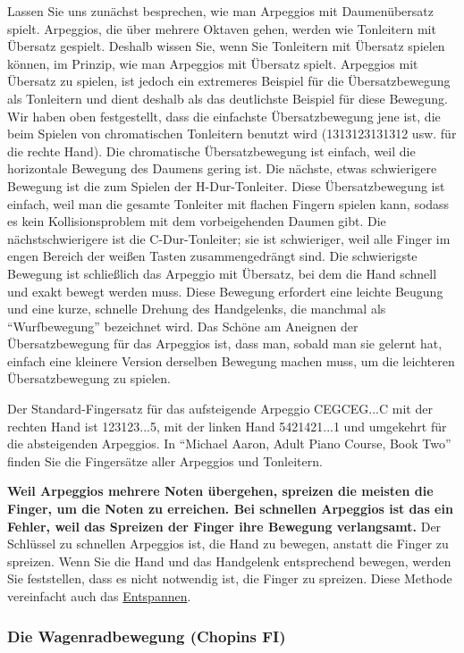 Lassen Sie uns zunächst besprechen, wie man Arpeggios mit Daumenübersatz spielt.
Arpeggios, die über mehrere Oktaven gehen, werden wie Tonleitern mit Übersatz gespielt.
Deshalb wissen Sie, wenn Sie Tonleitern mit Übersatz spielen können, im Prinzip, wie man Arpeggios mit Übersatz spielt.
Arpeggios mit Übersatz zu spielen, ist jedoch ein extremeres Beispiel für die Übersatzbewegung als Tonleitern und dient deshalb als das deutlichste Beispiel für diese Bewegung.
Wir haben oben festgestellt, dass die einfachste Übersatzbewegung jene ist, die beim Spielen von chromatischen Tonleitern benutzt wird (1313123131312 usw. für die rechte Hand).
Die chromatische Übersatzbewegung ist einfach, weil die horizontale Bewegung des Daumens gering ist.
Die nächste, etwas schwierigere Bewegung ist die zum Spielen der H-Dur-Tonleiter.
Diese Übersatzbewegung ist einfach, weil man die gesamte Tonleiter mit flachen Fingern spielen kann, sodass es kein Kollisionsproblem mit dem vorbeigehenden Daumen gibt.
Die nächstschwierigere ist die C-Dur-Tonleiter; sie ist schwieriger, weil alle Finger im engen Bereich der weißen Tasten zusammengedrängt sind.
Die schwierigste Bewegung ist schließlich das Arpeggio mit Übersatz, bei dem die Hand schnell und exakt bewegt werden muss.
Diese Bewegung erfordert eine leichte Beugung und eine kurze, schnelle Drehung des Handgelenks, die manchmal als \enquote{Wurfbewegung} bezeichnet wird.
Das Schöne am Aneignen der Übersatzbewegung für das Arpeggios ist, dass man, sobald man sie gelernt hat, einfach eine kleinere Version derselben Bewegung machen muss, um die leichteren Übersatzbewegung zu spielen.

Der Standard-Fingersatz für das aufsteigende Arpeggio CEGCEG...C mit der rechten Hand ist 123123...5, mit der linken Hand 5421421...1 und umgekehrt für die absteigenden Arpeggios.
In \enquote{Michael Aaron, Adult Piano Course, Book Two} finden Sie die Fingersätze aller Arpeggios und Tonleitern.

\textbf{Weil Arpeggios mehrere Noten übergehen, spreizen die meisten die Finger, um die Noten zu erreichen.
Bei schnellen Arpeggios ist das ein Fehler, weil das Spreizen der Finger ihre Bewegung verlangsamt.}
Der Schlüssel zu schnellen Arpeggios ist, die Hand zu bewegen, anstatt die Finger zu spreizen.
Wenn Sie die Hand und das Handgelenk entsprechend bewegen, werden Sie feststellen, dass es nicht notwendig ist, die Finger zu spreizen.
Diese Methode vereinfacht auch das \hyperlink{c1ii14}{Entspannen}.


\subsubsection{Die Wagenradbewegung (Chopins FI)}\hypertarget{c1iii5wagen}{}

